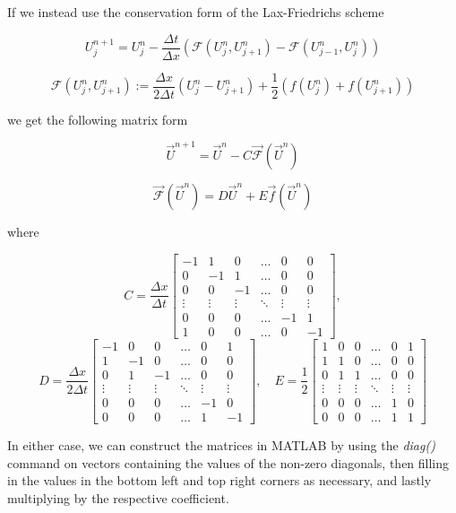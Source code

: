 \documentclass{myproject}
\begin{document}
If we instead use the conservation form of the Lax-Friedrichs scheme

\[
    U_j^{n+1} = U_j^n - \frac{\Delta t}{\Delta x} \left( \mathcal{F}(U_{j}^{n}, U_{j+1}^{n}) - \mathcal{F}(U_{j-1}^{n}, U_{j}^{n}) \right)
\]

\[
    \mathcal{F}(U_j^n, U_{j+1}^n) := \frac{\Delta x}{2 \Delta t}(U_j^n - U_{j+1}^n) + \frac{1}{2}\left( f(U_j^n) + f(U_{j+1}^n) \right)
\]

we get the following matrix form

\[
\vec{U}^{n+1} = \vec{U}^{n} - C\vec{\mathcal{F}}(\vec{U}^{n})
\]

\[
\vec{\mathcal{F}}(\vec{U}^{n}) = D\vec{U}^{n} + E\vec{f}(\vec{U}^{n})
\]

where

\[
C = \frac{\Delta x}{\Delta t}
\begin{bmatrix}
-1 & 1 & 0 & \dots & 0 & 0 \\
0 & -1 & 1 & \dots & 0 & 0 \\
0 & 0 & -1 & \dots & 0 & 0 \\
\vdots & \vdots & \vdots & \ddots & \vdots & \vdots \\
0 & 0 & 0 & \dots & -1 & 1 \\
1 & 0 & 0 & \dots & 0 & -1
\end{bmatrix},
\]
\[
D = \frac{\Delta x}{2 \Delta t}
\begin{bmatrix}
-1 & 0 & 0 & \dots & 0 & 1 \\
1 & -1 & 0 & \dots & 0 & 0 \\
0 & 1 & -1 & \dots & 0 & 0 \\
\vdots & \vdots & \vdots & \ddots & \vdots & \vdots \\
0 & 0 & 0 & \dots & -1 & 0 \\
0 & 0 & 0 & \dots & 1 & -1
\end{bmatrix},
\quad
E = \frac{1}{2}
\begin{bmatrix}
1 & 0 & 0 & \dots & 0 & 1 \\
1 & 1 & 0 & \dots & 0 & 0 \\
0 & 1 & 1 & \dots & 0 & 0 \\
\vdots & \vdots & \vdots & \ddots & \vdots & \vdots \\
0 & 0 & 0 & \dots & 1 & 0 \\
0 & 0 & 0 & \dots & 1 & 1
\end{bmatrix}
\]

In either case, we can construct the matrices in MATLAB by using the \textit{diag()} command on vectors containing the values of the non-zero diagonals, then filling in the values in the bottom left and top right corners as necessary, and lastly multiplying by the respective coefficient.
\end{document}
